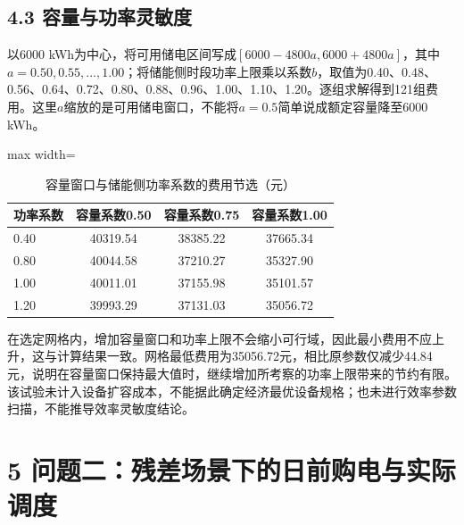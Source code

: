 \documentclass[UTF8,a4paper,zihao=-4,fontset=windows]{ctexart}
\begin{document}
\subsection{4.3 容量与功率灵敏度}
以6000 kWh为中心，将可用储电区间写成$[6000-4800a,6000+4800a]$，其中$a=0.50,0.55,\ldots,1.00$；将储能侧时段功率上限乘以系数$b$，取值为0.40、0.48、0.56、0.64、0.72、0.80、0.88、0.96、1.00、1.10、1.20。逐组求解得到121组费用。这里$a$缩放的是可用储电窗口，不能将$a=0.5$简单说成额定容量降至6000 kWh。
\par
\begin{table}[H]\centering
\fontsize{9.5}{12}\selectfont\setlength{\tabcolsep}{4pt}\renewcommand{\arraystretch}{1.12}
\begin{adjustbox}{max width=\linewidth}\begin{tabular}{lccc}\toprule
\textbf{功率系数} & \textbf{容量系数0.50} & \textbf{容量系数0.75} & \textbf{容量系数1.00}\\\midrule
0.40 & 40319.54 & 38385.22 & 37665.34\\
0.80 & 40044.58 & 37210.27 & 35327.90\\
1.00 & 40011.01 & 37155.98 & 35101.57\\
1.20 & 39993.29 & 37131.03 & 35056.72\\
\bottomrule\end{tabular}\end{adjustbox}
\caption{容量窗口与储能侧功率系数的费用节选（元）}
\end{table}
在选定网格内，增加容量窗口和功率上限不会缩小可行域，因此最小费用不应上升，这与计算结果一致。网格最低费用为35056.72元，相比原参数仅减少44.84元，说明在容量窗口保持最大值时，继续增加所考察的功率上限带来的节约有限。该试验未计入设备扩容成本，不能据此确定经济最优设备规格；也未进行效率参数扫描，不能推导效率灵敏度结论。
\par
\section{5 问题二：残差场景下的日前购电与实际调度}
\end{document}
